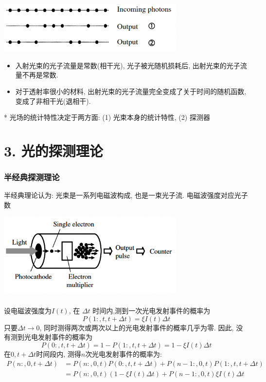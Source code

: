 \begin{frame} 
 \frametitle{}
   \begin{center}
        \includegraphics[width=0.7\textwidth]{figs/2022-05-07-15-17-44.png}
   \end{center}
\begin{itemize}
    \item 入射光束的光子流量是常数(相干光), 光子被光随机损耗后, 出射光束的光子流量不再是常数. 
    \item 对于透射率很小的材料, 出射光束的光子流量完全变成了关于时间的随机函数, 变成了非相干光(退相干).
\end{itemize} 
* 光场的统计特性决定于两方面: (1)  光束本身的统计特性, (2) 探测器   
\end{frame}

\section{ 3. 光的探测理论}

\begin{frame} 
 \frametitle{半经典探测理论}
 半经典理论认为: 光束是一系列电磁波构成, 也是一束光子流. 电磁波强度对应光子数
   \begin{center}
        \includegraphics[width=0.7\textwidth]{figs/2022-05-07-15-48-38.png}
   \end{center}      
\end{frame}

\begin{frame} 
 \frametitle{}
    设电磁波强度为$I(t)$, 在  $ \Delta t $ 时间内,测到一次光电发射事件的概率为 
    \[ P (1:, t, t+\Delta t) = \xi I(t) \Delta t \]
    只要$ \Delta t \to 0$, 同时测得两次或两次以上的光电发射事件的概率几乎为零. 因此, 没有测到光电发射事件的概率为 
    \[ P (0:, t, t+\Delta t) = 1- P (1:, t, t+\Delta t) =1- \xi I(t) \Delta t \]
    在$0, t+ \Delta t$时间段内, 测得$n$次光电发射事件的概率为:
    \[\begin{aligned}
        P (n:, 0, t+\Delta t) &= P (n:, 0, t) P (0:, t, t+\Delta t) + P (n-1:, 0, t) P (1:, t, t+\Delta t) \\ 
        &= P (n:, 0, t) (1- \xi I(t) \Delta t ) + P (n-1:, 0, t) \xi I(t) \Delta t 
    \end{aligned}\]
    
\end{frame}

